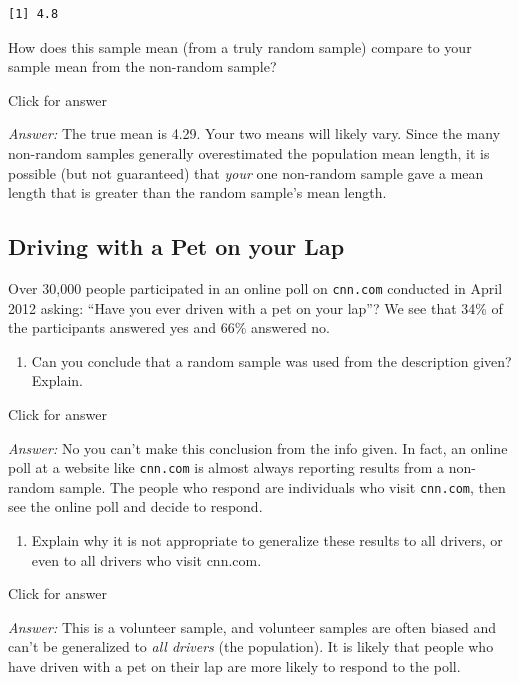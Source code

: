 \documentclass[
]{book}
\providecommand{\tightlist}{%
  \setlength{\itemsep}{0pt}\setlength{\parskip}{0pt}}
\begin{document}
\begin{verbatim}
[1] 4.8
\end{verbatim}

How does this sample mean (from a truly random sample) compare to your sample mean from the non-random sample?

Click for answer

\emph{Answer:} The true mean is 4.29. Your two means will likely vary. Since the many non-random samples generally overestimated the population mean length, it is possible (but not guaranteed) that \emph{your} one non-random sample gave a mean length that is greater than the random sample's mean length.

\hypertarget{driving-with-a-pet-on-your-lap}{%
\subsection{Driving with a Pet on your Lap}\label{driving-with-a-pet-on-your-lap}}

Over 30,000 people participated in an online poll on \texttt{cnn.com} conducted in April 2012 asking: ``Have you ever driven with a pet on your lap''? We see that 34\% of the participants answered yes and 66\% answered no.

\begin{enumerate}
\def\labelenumi{\alph{enumi}.}
\tightlist
\item
  Can you conclude that a random sample was used from the description given? Explain.
\end{enumerate}

Click for answer

\emph{Answer:} No you can't make this conclusion from the info given. In fact, an online poll at a website like \texttt{cnn.com} is almost always reporting results from a non-random sample. The people who respond are individuals who visit \texttt{cnn.com}, then see the online poll and decide to respond.

\begin{enumerate}
\def\labelenumi{\alph{enumi}.}
\setcounter{enumi}{1}
\tightlist
\item
  Explain why it is not appropriate to generalize these results to all drivers, or even to all drivers who visit cnn.com.
\end{enumerate}

Click for answer

\emph{Answer:} This is a volunteer sample, and volunteer samples are often biased and can't be generalized to \emph{all drivers} (the population). It is likely that people who have driven with a pet on their lap are more likely to respond to the poll.
\end{document}

